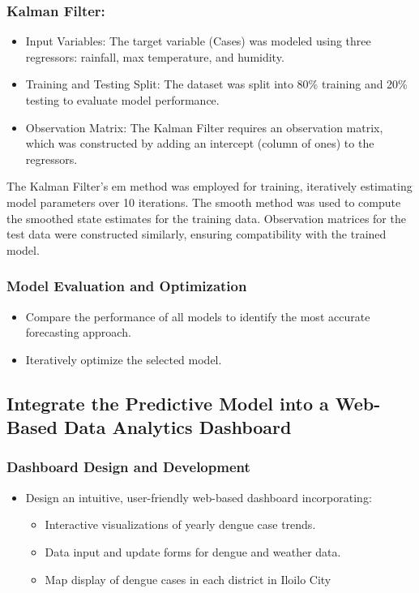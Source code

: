 \subsubsection{Kalman Filter:}
\begin{itemize}
	\item Input Variables: The target variable (Cases) was modeled using three regressors: rainfall, max temperature, and humidity.
	\item Training and Testing Split: The dataset was split into 80\% training and 20\% testing to evaluate model performance.
	\item Observation Matrix: The Kalman Filter requires an observation matrix, which was constructed by adding an intercept (column of ones) to the regressors.
\end{itemize}

The Kalman Filter's em method was employed for training, iteratively estimating model parameters over 10 iterations.
The smooth method was used to compute the smoothed state estimates for the training data.
Observation matrices for the test data were constructed similarly, ensuring compatibility with the trained model.

\subsubsection{Model Evaluation and Optimization}
\begin{itemize}
	\item Compare the performance of all models to identify the most accurate forecasting approach.
	\item Iteratively optimize the selected model.
\end{itemize}

\subsection{Integrate the Predictive Model into a Web-Based Data Analytics Dashboard}

\subsubsection{Dashboard Design and Development}
\begin{itemize}
	\item Design an intuitive, user-friendly web-based dashboard incorporating:
	\begin{itemize}
		\item Interactive visualizations of yearly dengue case trends.
		\item Data input and update forms for dengue and weather data.
		\item Map display of dengue cases in each district in Iloilo City
	\end{itemize}
\end{itemize}

